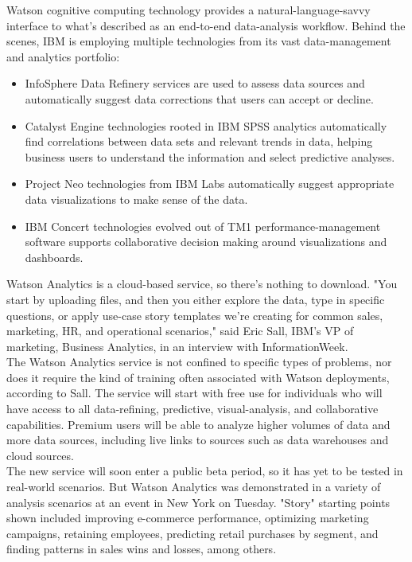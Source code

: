 \documentclass[runningheads,a4paper]{llncs}
\begin{document}
Watson cognitive computing technology provides a natural-language-savvy interface to what's described as an end-to-end data-analysis workflow. Behind the scenes, IBM is employing multiple technologies from its vast data-management and analytics portfolio:

\begin{itemize}
	\item InfoSphere Data Refinery services are used to assess data sources and automatically suggest data corrections that users can accept or decline.
	\item Catalyst Engine technologies rooted in IBM SPSS analytics automatically find correlations between data sets and relevant trends in data, helping business users to understand the information and select predictive analyses.
	\item Project Neo technologies from IBM Labs automatically suggest appropriate data visualizations to make sense of the data.
	\item IBM Concert technologies evolved out of TM1 performance-management software supports collaborative decision making around visualizations and dashboards.
\end{itemize}

Watson Analytics is a cloud-based service, so there's nothing to download. "You start by uploading files, and then you either explore the data, type in specific questions, or apply use-case story templates we're creating for common sales, marketing, HR, and operational scenarios," said Eric Sall, IBM's VP of marketing, Business Analytics, in an interview with InformationWeek.\\

The Watson Analytics service is not confined to specific types of problems, nor does it require the kind of training often associated with Watson deployments, according to Sall. The service will start with free use for individuals who will have access to all data-refining, predictive, visual-analysis, and collaborative capabilities. Premium users will be able to analyze higher volumes of data and more data sources, including live links to sources such as data warehouses and cloud sources.\\

The new service will soon enter a public beta period, so it has yet to be tested in real-world scenarios. But Watson Analytics was demonstrated in a variety of analysis scenarios at an event in New York on Tuesday. "Story" starting points shown included improving e-commerce performance, optimizing marketing campaigns, retaining employees, predicting retail purchases by segment, and finding patterns in sales wins and losses, among others.  
\end{document}
